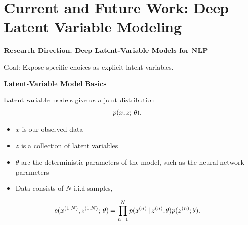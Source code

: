 
\section{Current and Future Work: Deep Latent Variable Modeling}

\begin{frame}
\begin{center}
    \textbf{Research Direction: Deep Latent-Variable Models for NLP }
  \end{center}
  Goal: Expose specific choices as explicit latent variables.   
  
\end{frame}

\begin{frame}
\begin{center}
    \textbf{ Latent-Variable Model Basics }
  \end{center}
  
Latent variable models give us a joint distribution
\begin{align*}
p(x, z ; \, \theta).
\end{align*}

\pause
\begin{itemize}
    \item $x$ is our observed data
    \item $z$ is a collection of latent variables
    \item $\theta$ are the deterministic parameters of the model, such as the neural network parameters
\end{itemize}

\pause

\begin{itemize}
    \item Data consists of $N$ i.i.d samples,
\end{itemize}


                \[ p(x^{(1:N)}, z^{(1:N)} ; \, \theta ) = \prod_{n=1}^N p(x^{(n)} \,|\, z^{(n)}; \theta) p(z^{(n)};\theta). \]
\end{frame}

